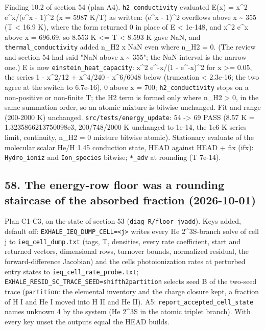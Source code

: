 \documentclass[english,a4paper]{my_memo}
\begin{document}
Finding 10.2 of section 54 (plan A4). \texttt{h2\_conductivity} evaluated
E(x) = x\^{}2 e\^{}x/(e\^{}x - 1)\^{}2 (x = 5987 K/T) as written: (e\^{}x - 1)\^{}2 overflows
above x \textasciitilde{} 355 (T \textless{} 16.9 K), where the form returned 0 in place of
E \textless{} 1e-148, and x\^{}2 e\^{}x above x = 696.69, so 8.553 K \textless= T \textless{} 8.593 K gave
NaN, and \texttt{thermal\_conductivity} added n\_H2 x NaN even where n\_H2 = 0. (The
review and section 54 had said "NaN above x \textasciitilde{} 355"; the NaN interval is the
narrow one.) E is now \texttt{einstein\_heat\_capacity}: x\^{}2 e\^{}-x/(1 - e\^{}-x)\^{}2 for
x \textgreater= 0.05, the series 1 - x\^{}2/12 + x\^{}4/240 - x\^{}6/6048 below (truncation
\textless{} 2.3e-16; the two agree at the switch to 6.7e-16), 0 above x = 700;
\texttt{h2\_conductivity} stops on a non-positive or non-finite T; the H2 term is
formed only where n\_H2 \textgreater{} 0, in the same summation order, so an atomic
mixture is bitwise unchanged. Fit and range (200-2000 K) unchanged.
\texttt{src/tests/energy\_update}: 54 -\textgreater{} 69 PASS (8.57 K = 1.3235866213750098e3,
200/748/2000 K unchanged to 1e-14, the 1e6 K series limit, continuity,
n\_H2 = 0 mixture bitwise atomic). Stationary evaluate of the molecular
scalar He/H 1.45 conduction state, HEAD against HEAD + fix (ifx):
\texttt{Hydro\_ioniz} and \texttt{Ion\_species} bitwise; \texttt{*\_adv} at rounding (T 7e-14).

\subsection{58. The energy-row floor was a rounding staircase of the absorbed fraction (2026-10-01)}\label{58-the-energy-row-floor-was-a-rounding-staircase-of-the-absorbed-fraction-2026-10-01}

Plan C1-C3, on the state of section 53 (\texttt{diag\_R/floor\_jvadd}). Keys added,
default off: \texttt{EXHALE\_IEQ\_DUMP\_CELL=\textless{}j\textgreater{}} writes every He 2\^{}3S-branch solve of
cell j to \texttt{ieq\_cell\_dump.txt} (tags, T, densities, every rate coefficient,
start and returned vectors, dimensional rows, turnover bounds, normalized
residual, the forward-difference Jacobian) and the cell\textquotesingle s photoionization
rates at perturbed entry states to \texttt{ieq\_cell\_rate\_probe.txt};
\texttt{EXHALE\_RESID\_SC\_TRACE\_SEED=shift\textbar{}h2\textbar{}partition} selects seed B of the
two-seed trace (\texttt{partition}: the elemental inventory and the charge closure
kept, a fraction of H I and He I moved into H II and He II). A5:
\texttt{report\_accepted\_cell\_state} names unknown 4 by the system (He 2\^{}3S in the
atomic triplet branch). With every key unset the outputs equal the HEAD
build\textquotesingle s.
\end{document}
